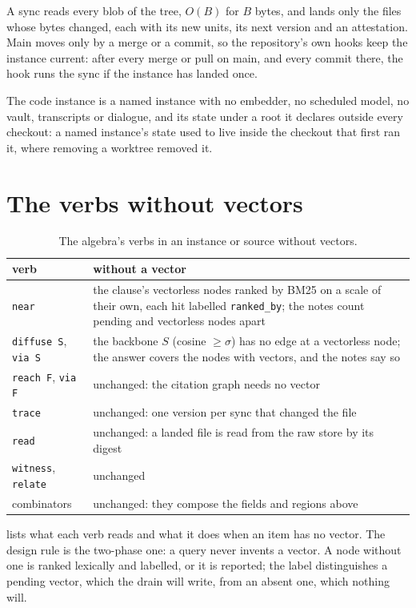 \documentclass[11pt]{article}
\theoremstyle{plain}
\theoremstyle{definition}
\theoremstyle{remark}
\newcommand{\code}[1]{\texttt{#1}}
\begin{document}
A sync reads every blob of the tree, $O(B)$ for $B$ bytes, and lands only the files whose bytes
changed, each with its new units, its next version and an attestation. Main moves only by a merge
or a commit, so the repository's own hooks keep the instance current: after every merge or pull
on main, and every commit there, the hook runs the sync if the instance has landed once.

The code instance is a named instance with no embedder, no scheduled model, no vault, transcripts
or dialogue, and its state under a root it declares outside every checkout: a named instance's
state used to live inside the checkout that first ran it, where removing a worktree removed it.

\section{The verbs without vectors}\label{sec:verbs}

\begin{table}[t]
\centering\small
\begin{tabularx}{\linewidth}{@{}lX@{}}
\toprule
verb & without a vector \\
\midrule
\code{near} & the clause's vectorless nodes ranked by BM25 on a scale of their own, each hit
labelled \code{ranked\_by}; the notes count pending and vectorless nodes apart \\
\code{diffuse S}, \code{via S} & the backbone $S$ (cosine $\ge\sigma$) has no edge at a
vectorless node; the answer covers the nodes with vectors, and the notes say so \\
\code{reach F}, \code{via F} & unchanged: the citation graph needs no vector \\
\code{trace} & unchanged: one version per sync that changed the file \\
\code{read} & unchanged: a landed file is read from the raw store by its digest \\
\code{witness}, \code{relate} & unchanged \\
combinators & unchanged: they compose the fields and regions above \\
\bottomrule
\end{tabularx}
\caption{The algebra's verbs in an instance or source without vectors.}\label{tab:verbs}
\end{table}

 lists what each verb reads and what it does when an item has no vector. The
design rule is the two-phase one: a query never invents a vector. A node without one is ranked
lexically and labelled, or it is reported; the label distinguishes a pending vector, which the
drain will write, from an absent one, which nothing will.
\end{document}
